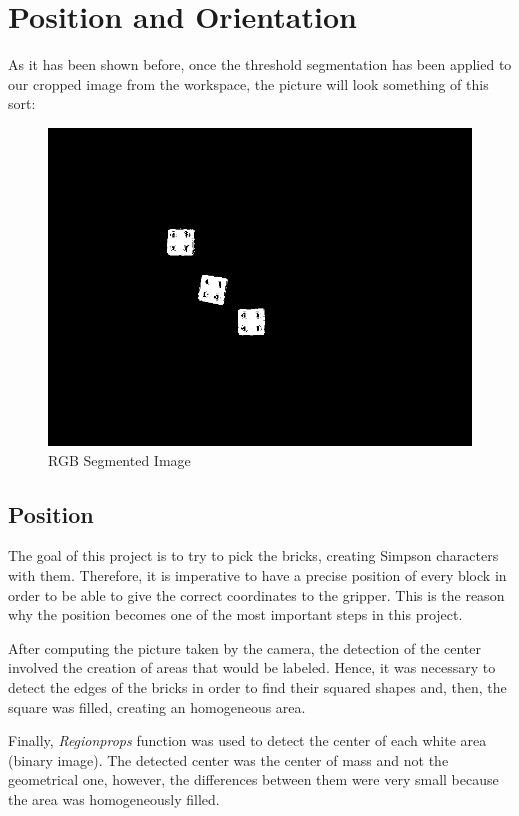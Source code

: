 \chapter{Position and Orientation}\label{ch:position_rotation}

As it has been shown before, once the threshold segmentation has been applied to our cropped image from the workspace, the picture will look something of this sort:

\begin{figure}[h]
  \centering
  \includegraphics[scale=0.3]{figures/thresh_img.png}
  \caption[thresholded_image] {RGB Segmented Image}
\end{figure}

\section{Position}
The goal of this project is to try to pick the bricks, creating Simpson characters with them. Therefore, it is imperative to have a precise position of every block in order to be able to give the correct coordinates to the gripper. This is the reason why the position becomes one of the most important steps in this project.

After computing the picture taken by the camera, the detection of the center involved the creation of areas that would be labeled. Hence, it was necessary to detect the edges of the bricks in order to find their squared shapes and, then, the square was filled, creating an homogeneous area.

Finally, \textit{Regionprops} function was used to detect the center of each white area (binary image). The detected center was the center of mass and not the geometrical one, however, the differences between them were very small because the area was homogeneously filled.


